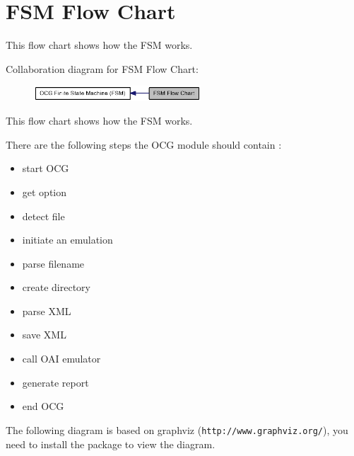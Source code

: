 \section{FSM Flow Chart}
\label{group____fsm__flow}
This flow chart shows how the FSM works.  




Collaboration diagram for FSM Flow Chart:\nopagebreak
\begin{figure}[H]
\begin{center}
\leavevmode
\includegraphics[width=177pt]{group____fsm__flow}
\end{center}
\end{figure}
This flow chart shows how the FSM works. 

There are the following steps the OCG module should contain :\begin{itemize}
\item start OCG\item get option\item detect file\item initiate an emulation\item parse filename\item create directory\item parse XML\item save XML\item call OAI emulator\item generate report\item end OCG\end{itemize}


The following diagram is based on graphviz ({\tt http://www.graphviz.org/}), you need to install the package to view the diagram.

